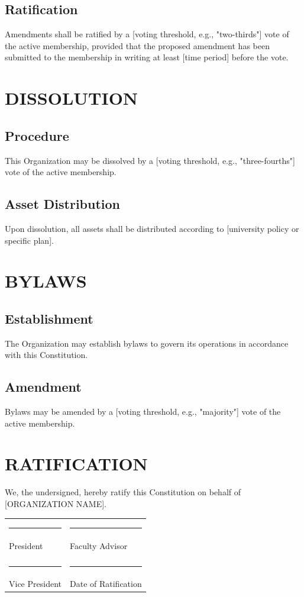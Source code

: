 \documentclass[12pt,letterpaper]{article}
\begin{document}
\subsection{Ratification}
Amendments shall be ratified by a [voting threshold, e.g., "two-thirds"] vote of the active membership, provided that the proposed amendment has been submitted to the membership in writing at least [time period] before the vote.

\section{DISSOLUTION}

\subsection{Procedure}
This Organization may be dissolved by a [voting threshold, e.g., "three-fourths"] vote of the active membership.

\subsection{Asset Distribution}
Upon dissolution, all assets shall be distributed according to [university policy or specific plan].

\section{BYLAWS}

\subsection{Establishment}
The Organization may establish bylaws to govern its operations in accordance with this Constitution.

\subsection{Amendment}
Bylaws may be amended by a [voting threshold, e.g., "majority"] vote of the active membership.

\clearpage
\section*{RATIFICATION}

We, the undersigned, hereby ratify this Constitution on behalf of [ORGANIZATION NAME].

\vspace{1cm}
\begin{tabular}{p{3in}p{3in}}
\rule{3in}{0.5pt} & \rule{3in}{0.5pt} \\
President & Faculty Advisor \\
& \\
\rule{3in}{0.5pt} & \rule{3in}{0.5pt} \\
Vice President & Date of Ratification \\
\end{tabular}
\end{document}
